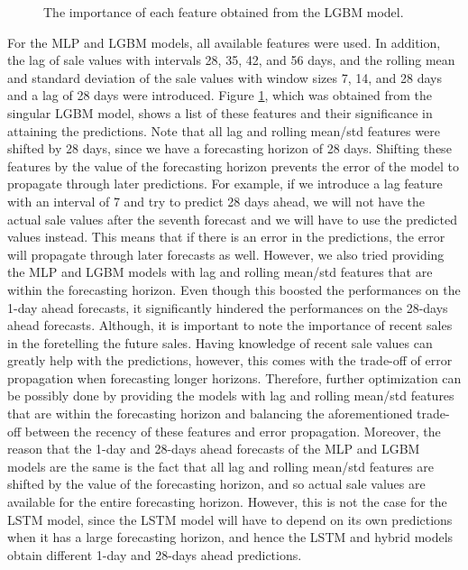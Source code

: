 \begin{figure}[b!]
    \centering
    \caption{The importance of each feature obtained from the LGBM model.}
    \label{fig:feat_imp}
\end{figure}
For the MLP and LGBM models, all available features were used. In addition, the lag of sale values with intervals 28, 35, 42, and 56 days, and the rolling mean and standard deviation of the sale values with window sizes 7, 14, and 28 days and a lag of 28 days were introduced.
Figure \ref{fig:feat_imp}, which was obtained from the singular LGBM model, shows a list of these features and their significance in attaining the predictions.
Note that all lag and rolling mean/std features were shifted by 28 days, since we have a forecasting horizon of 28 days.
Shifting these features by the value of the forecasting horizon prevents the error of the model to propagate through later predictions.
For example, if we introduce a lag feature with an interval of 7 and try to predict 28 days ahead, we will not have the actual sale values after the seventh forecast and we will have to use the predicted values instead. 
This means that if there is an error in the predictions, the error will propagate through later forecasts as well.
However, we also tried providing the MLP and LGBM models with lag and rolling mean/std features that are within the forecasting horizon. 
Even though this boosted the performances on the 1-day ahead forecasts, it significantly hindered the performances on the 28-days ahead forecasts.
Although, it is important to note the importance of recent sales in the foretelling the future sales. 
Having knowledge of recent sale values can greatly help with the predictions, however, this comes with the trade-off of error propagation when forecasting longer horizons.
Therefore, further optimization can be possibly done by providing the models with lag and rolling mean/std features that are within the forecasting horizon and balancing the aforementioned trade-off between the recency of these features and error propagation.
Moreover, the reason that the 1-day and 28-days ahead forecasts of the MLP and LGBM models are the same is the fact that all lag and rolling mean/std features are shifted by the value of the forecasting horizon, and so actual sale values are available for the entire forecasting horizon.
However, this is not the case for the LSTM model, since the LSTM model will have to depend on its own predictions when it has a large forecasting horizon, and hence the LSTM and hybrid models obtain different 1-day and 28-days ahead predictions.